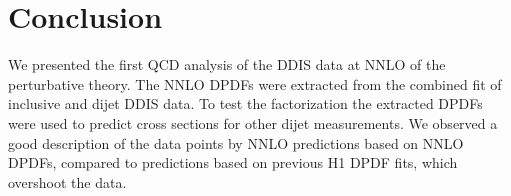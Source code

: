 \documentclass{PoS}
\begin{document}
\section{Conclusion}
We presented the first QCD analysis of the DDIS data at NNLO of the perturbative theory.
The NNLO DPDFs were extracted from the combined fit of inclusive and dijet DDIS data.
To test the factorization the extracted DPDFs were used to predict cross sections for other dijet measurements.
We observed a good description of the data points by NNLO predictions based on NNLO DPDFs, compared to predictions based on previous H1 DPDF fits, which overshoot the data.




\end{document}
